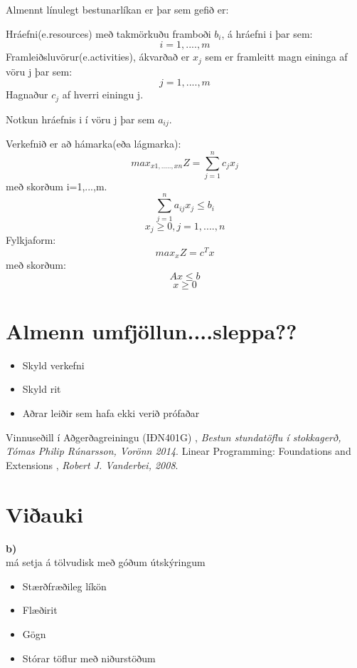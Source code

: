 \documentclass[a4paper,12pt]{article}
\begin{document}
Almennt línulegt bestunarlíkan er þar sem gefið er:

Hráefni(e.resources) með takmörkuðu framboði $b_i$, á hráefni i þar sem:
\[i=1,....,m\]
Framleiðsluvörur(e.activities), ákvarðað er $x_j$ sem er framleitt magn eininga af vöru j þar sem:
\[j=1,....,m\]
Hagnaður $c_j$ af hverri einingu j. 

Notkun hráefnis i í vöru j þar sem $a_{ij}$.

Verkefnið er að hámarka(eða lágmarka):
\[max_{x1,.....,xn}Z = \sum_{j=1}^{n}c_j x_j\]
með skorðum i=1,...,m.
\[\sum_{j=1}^{n}a_{ij} x_j\leq b_i\]
\[x_j\geq 0, j=1,....,n\]
Fylkjaform:
\[max_xZ=c^Tx\]
með skorðum:
\[Ax\leq b\]
\[x\geq 0\]

\section{Almenn umfjöllun....sleppa??}
\begin{itemize}
\item Skyld verkefni
\item Skyld rit
\item Aðrar leiðir sem hafa ekki verið prófaðar
\end{itemize}




\pagebreak

\begin{thebibliography}{2}
	 Vinnuseðill í Aðgerðagreiningu (IÐN401G) , \textit{Bestun stundatöflu í stokkagerð, Tómas Philip Rúnarsson, Vorönn 2014}. 
	 Linear Programming: Foundations and Extensions , \textit{Robert J. Vanderbei, 2008}. 
\end{thebibliography}


\pagebreak
\section{Viðauki}
\textbf{b)} \\


má setja á tölvudisk með góðum útskýringum
\begin{itemize}
\item Stærðfræðileg líkön
\item Flæðirit
\item Gögn
\item Stórar töflur með niðurstöðum
\end{itemize}
\end{document}
